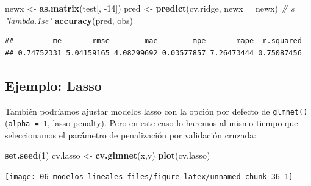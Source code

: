 \documentclass[
  spanish,
]{book}
\newenvironment{Shaded}{\begin{snugshade}}{\end{snugshade}}
\newcommand{\CommentTok}[1]{\textcolor[rgb]{0.56,0.35,0.01}{\textit{#1}}}
\newcommand{\DataTypeTok}[1]{\textcolor[rgb]{0.13,0.29,0.53}{#1}}
\newcommand{\DecValTok}[1]{\textcolor[rgb]{0.00,0.00,0.81}{#1}}
\newcommand{\FloatTok}[1]{\textcolor[rgb]{0.00,0.00,0.81}{#1}}
\newcommand{\KeywordTok}[1]{\textcolor[rgb]{0.13,0.29,0.53}{\textbf{#1}}}
\newcommand{\NormalTok}[1]{#1}
\newcommand{\OperatorTok}[1]{\textcolor[rgb]{0.81,0.36,0.00}{\textbf{#1}}}
\newcommand{\OtherTok}[1]{\textcolor[rgb]{0.56,0.35,0.01}{#1}}
\newcommand{\StringTok}[1]{\textcolor[rgb]{0.31,0.60,0.02}{#1}}
\theoremstyle{break}
\theoremstyle{definition}
\theoremstyle{definition}
\theoremstyle{definition}
\theoremstyle{remark}
\begin{document}
\begin{Shaded}
\begin{Highlighting}[]
\NormalTok{newx <-}\StringTok{ }\KeywordTok{as.matrix}\NormalTok{(test[, }\DecValTok{-14}\NormalTok{])}
\NormalTok{pred <-}\StringTok{ }\KeywordTok{predict}\NormalTok{(cv.ridge, }\DataTypeTok{newx =}\NormalTok{ newx) }\CommentTok{# s = "lambda.1se"}
\KeywordTok{accuracy}\NormalTok{(pred, obs)}
\end{Highlighting}
\end{Shaded}

\begin{verbatim}
##         me       rmse        mae        mpe       mape  r.squared 
## 0.74752331 5.04159165 4.08299692 0.03577857 7.26473444 0.75087456
\end{verbatim}

\hypertarget{ejemplo-lasso}{%
\subsection{Ejemplo: Lasso}\label{ejemplo-lasso}}

También podríamos ajustar modelos lasso con la opción por defecto de \texttt{glmnet()} (\texttt{alpha\ =\ 1}, lasso penalty).
Pero en este caso lo haremos al mismo tiempo que seleccionamos el parámetro de penalización por validación cruzada:

\begin{Shaded}
\begin{Highlighting}[]
\KeywordTok{set.seed}\NormalTok{(}\DecValTok{1}\NormalTok{)}
\NormalTok{cv.lasso <-}\StringTok{ }\KeywordTok{cv.glmnet}\NormalTok{(x,y)}
\KeywordTok{plot}\NormalTok{(cv.lasso)}
\end{Highlighting}
\end{Shaded}

\begin{center}\texttt{[image: 06-modelos\_lineales\_files/figure-latex/unnamed-chunk-36-1]} \end{center}

\begin{Shaded}
\end{Shaded}
\end{document}

